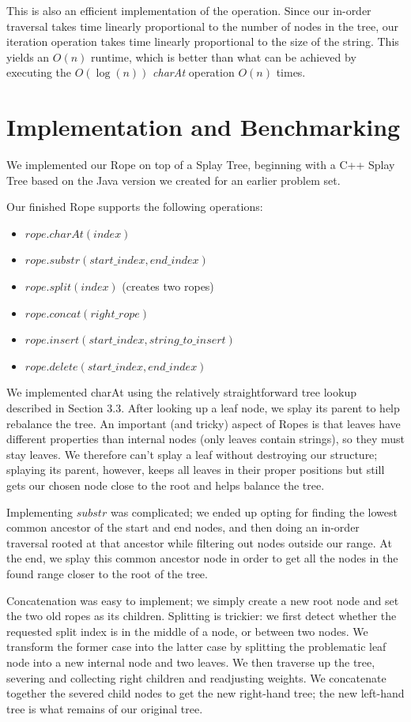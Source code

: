 \documentclass[12pt]{article}
\begin{document}
This is also an efficient implementation of the operation. Since our in-order traversal takes time linearly proportional to the number of nodes in the tree, our iteration operation takes time linearly proportional to the size of the string. This yields an $O(n)$ runtime, which is better than what can be achieved by executing the $O(\log(n))$ \emph{charAt} operation $O(n)$ times.

\section{Implementation and Benchmarking}

We implemented our Rope on top of a Splay Tree, beginning with a C++ Splay Tree based on the Java version we created for an earlier problem set. 

Our finished Rope supports the following operations:
\begin{itemize}
\item $rope.charAt(index)$
\item $rope.substr(start\_index, end\_index)$
\item $rope.split(index)$ (creates two ropes)
\item $rope.concat(right\_rope)$
\item $rope.insert(start\_index, string\_to\_insert)$
\item $rope.delete(start\_index, end\_index)$
\end{itemize}

We implemented charAt using the relatively straightforward tree lookup described in Section $3.3$. After looking up a leaf node, we splay its parent to help rebalance the tree. An important (and tricky) aspect of Ropes is that leaves have different properties than internal nodes (only leaves contain strings), so they must stay leaves. We therefore can't splay a leaf without destroying our structure; splaying its parent, however, keeps all leaves in their proper positions but still gets our chosen node close to the root and helps balance the tree.

Implementing $substr$ was complicated; we ended up opting for finding the lowest common ancestor of the start and end nodes, and then doing an in-order traversal rooted at that ancestor while filtering out nodes outside our range. At the end, we splay this common ancestor node in order to get all the nodes in the found range closer to the root of the tree.

Concatenation was easy to implement; we simply create a new root node and set the two old ropes as its children. Splitting is trickier: we first detect whether the requested split index is in the middle of a node, or between two nodes. We transform the former case into the latter case by splitting the problematic leaf node into a new internal node and two leaves. We then traverse up the tree, severing and collecting right children and readjusting weights. We concatenate together the severed child nodes to get the new right-hand tree; the new left-hand tree is what remains of our original tree.
\end{document}
